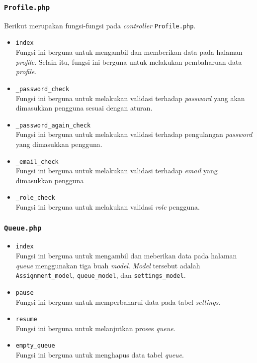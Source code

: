 \subsubsection{\texttt{Profile.php}}
Berikut merupakan fungsi-fungsi pada \textit{controller} \texttt{Profile.php}.
\begin{itemize}
	\item \texttt{index}\\
	Fungsi ini berguna untuk mengambil dan memberikan data pada halaman \textit{profile}. Selain itu, fungsi ini berguna untuk melakukan pembaharuan data \textit{profile}.
	\item \texttt{\_password\_check}\\
	Fungsi ini berguna untuk melakukan validasi terhadap \textit{password} yang akan dimasukkan pengguna sesuai dengan aturan.
	\item \texttt{\_password\_again\_check}\\
	Fungsi ini berguna untuk melakukan validasi terhadap pengulangan \textit{password} yang dimasukkan pengguna.
	\item \texttt{\_email\_check}\\
	Fungsi ini berguna untuk melakukan validasi terhadap \textit{email} yang dimasukkan pengguna
	\item \texttt{\_role\_check}\\
	 Fungsi ini berguna untuk melakukan validasi \textit{role} pengguna.
\end{itemize}
\subsubsection{\texttt{Queue.php}}
\begin{itemize}
	\item \texttt{index}\\
	Fungsi ini berguna untuk mengambil dan meberikan data pada halaman \textit{queue} menggunakan tiga buah \textit{model}. \textit{Model} tersebut adalah \texttt{Assignment\_model}, \texttt{queue\_model}, dan \texttt{settings\_model}.
	\item \texttt{pause}\\
	Fungsi ini berguna untuk memperbaharui data pada tabel \textit{settings}.
	\item \texttt{resume}\\
	Fungsi ini berguna untuk melanjutkan proses \textit{queue}.
	\item \texttt{empty\_queue}\\
	Fungsi ini berguna untuk menghapus data tabel \textit{queue}.
\end{itemize}
